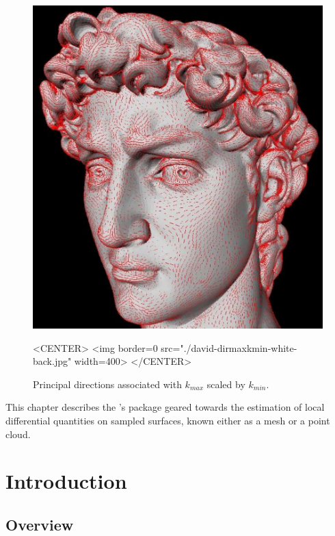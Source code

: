 


\begin{figure}[!ht]
\begin{ccTexOnly}
\centerline{
\includegraphics[width=.5\linewidth]{Jet_fitting_3/david-dirmaxkmin-jpg-white-back}}
\end{ccTexOnly}
\caption{Principal directions associated with $k_{max}$ scaled by $k_{min}$.}

\begin{ccHtmlOnly}
<CENTER> <img border=0 src="./david-dirmaxkmin-white-back.jpg" width=400>
</CENTER>
\end{ccHtmlOnly}
\end{figure}

This chapter describes the \cgal's package geared towards the
estimation of local differential quantities on sampled surfaces, known
either as a mesh or a point cloud.
 
\section{Introduction}
\label{sec:intro}

\subsection{Overview}

